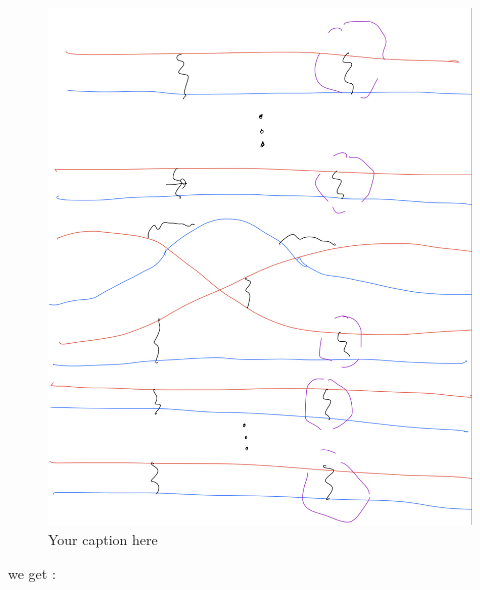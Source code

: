 \begin{figure}[H] %
    \centering
    \includegraphics[width=\linewidth]{diagrams/definition12/5.png} %
    \caption{Your caption here}
    \label{fig:your-label}
\end{figure}

we get :

